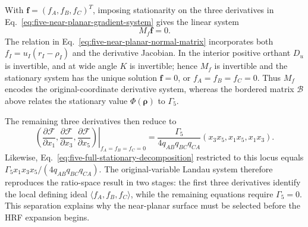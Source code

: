 \documentclass[a4paper,11pt]{article}
\begin{document}
With \(\boldsymbol f=(f_A,f_B,f_C)^T\), imposing stationarity on the three
derivatives in Eq.~\eqref{eq:five-near-planar-gradient-system} gives the
linear system
\[
 M_f\boldsymbol f=0.
\]
The relation in Eq.~\eqref{eq:five-near-planar-normal-matrix} incorporates
both \(f_I=u_I(r_I-\rho_I)\) and the derivative Jacobian.  In the interior
positive orthant \(D_u\) is invertible, and at wide angle \(K\) is
invertible; hence \(M_f\) is invertible and the stationary system has the
unique solution \(\boldsymbol f=0\), or \(f_A=f_B=f_C=0\).  Thus \(M_f\)
encodes the original-coordinate derivative
system, whereas the bordered matrix \(\mathcal B\) above relates the
stationary value \(\Phi(\boldsymbol\rho)\) to \(\Gamma_5\).

The remaining three derivatives then reduce to
\begin{equation}
 \left.\left(
 \frac{\partial\mathcal F}{\partial x_1},
 \frac{\partial\mathcal F}{\partial x_3},
 \frac{\partial\mathcal F}{\partial x_5}
 \right)\right|_{f_A=f_B=f_C=0}
 =\frac{\Gamma_5}{4q_{AB}q_{BC}q_{CA}}
 (x_3x_5,x_1x_5,x_1x_3).
 \label{eq:five-remaining-gradient-system}
\end{equation}
Likewise, Eq.~\eqref{eq:five-full-stationary-decomposition} restricted to
this locus equals
\(\Gamma_5x_1x_3x_5/(4q_{AB}q_{BC}q_{CA})\).  The original-variable Landau
system therefore reproduces the ratio-space result in two stages: the first
three derivatives identify the local defining ideal
\(\langle f_A,f_B,f_C\rangle\), while the remaining equations require
\(\Gamma_5=0\).  This separation explains why the near-planar surface must
be selected before the HRF expansion begins.
\end{document}

